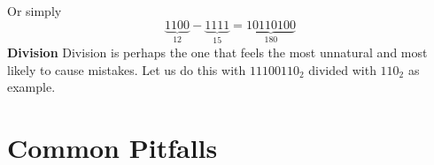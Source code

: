 Or simply
\begin{equation} \label{eq15}
	\underbrace{1100}_\text{12}-\underbrace{1111}_\text{15} = \underbrace{10110100}_\text{180}
\end{equation}
\noindent\large\textbf{Division}\newline
\normalsize Division is perhaps the one that feels the most unnatural and most likely to cause mistakes. Let us do this with $11100110_2$ divided with $110_2$ as example.

\section{Common Pitfalls}